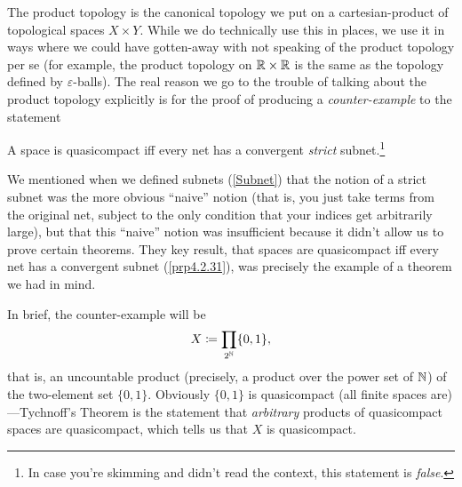 The product topology is the canonical topology we put on a cartesian-product of topological spaces $X\times Y$.  While we do technically use this in places, we use it in ways where we could have gotten-away with not speaking of the product topology per se (for example, the product topology on $\mathbb{R} \times \mathbb{R}$ is the same as the topology defined by $\varepsilon$-balls).  The real reason we go to the trouble of talking about the product topology explicitly is for the proof of producing a \emph{counter-example} to the statement
\begin{textequation}
A space is quasicompact iff every net has a convergent \emph{strict} subnet.\footnote{In case you're skimming and didn't read the context, this statement is \emph{false}.}
\end{textequation}
We mentioned when we defined subnets (\cref{Subnet}) that the notion of a strict subnet was the more obvious ``naive'' notion (that is, you just take terms from the original net, subject to the only condition that your indices get arbitrarily large), but that this ``naive'' notion was insufficient because it didn't allow us to prove certain theorems.  They key result, that spaces are quasicompact iff every net has a convergent subnet (\cref{prp4.2.31}), was precisely the example of a theorem we had in mind.

In brief, the counter-example will be
\begin{equation}
X\coloneqq \prod _{2^{\mathbb{N}}}\{ 0,1\} ,
\end{equation}
that is, an uncountable product (precisely, a product over the power set of $\mathbb{N}$) of the two-element set $\{ 0,1\}$.  Obviously $\{ 0,1\}$ is quasicompact (all finite spaces are)---Tychnoff's Theorem is the statement that \emph{arbitrary} products of quasicompact spaces are quasicompact, which tells us that $X$ is quasicompact.

